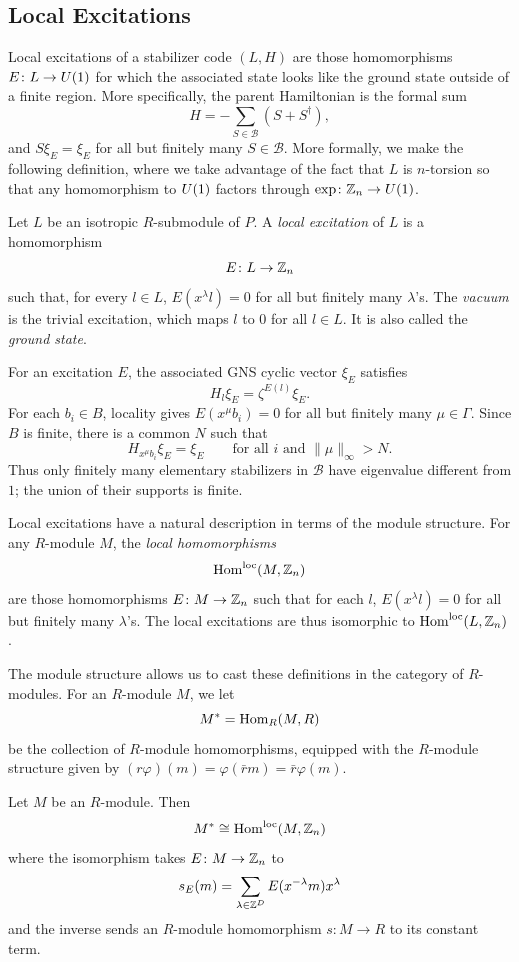 \documentclass[11pt]{amsart}
\begin{document}
\subsection{Local Excitations}
Local excitations of a stabilizer code $(L,H)$ are those homomorphisms $E \colon L \to U(1)$ for which the associated state looks like the ground state outside of a finite region.
More specifically, the parent Hamiltonian is the formal sum
\[H=-\sum_{S\in\mathcal B}(S+S^\dagger),\]
and $S\xi_E=\xi_E$ for all but finitely many $S\in\mathcal B$.
More formally, we make the following definition, where we take advantage of the fact that $L$ is $n$-torsion so that any homomorphism to $U(1)$ factors through $\exp \colon \mathbb{Z}_n \to U(1)$.
\begin{defn}\label{defn:local_excitation}
Let $L$ be an isotropic $R$-submodule of $P$.
A \emph{local excitation} of $L$ is a homomorphism
\[ E \colon L \to \mathbb{Z}_n \]
such that, for every $l\in L$, $E(x^\lambda l)=0$ for all but finitely many $\lambda$'s. The \emph{vacuum} is the trivial excitation, which maps $l$ to $0$ for all $l \in L$. It is also called the \emph{ground state}.
\end{defn}

For an excitation $E$, the associated GNS cyclic vector $\xi_E$ satisfies
\[H_l\xi_E=\zeta^{E(l)}\xi_E.\]
For each $b_i\in B$, locality gives $E(x^\mu b_i)=0$ for all but finitely many $\mu\in\Gamma$. Since $B$ is finite, there is a common $N$ such that
\[
H_{x^\mu b_i}\xi_E=\xi_E
\qquad\text{for all }i\text{ and }\|\mu\|_\infty>N.
\]
Thus only finitely many elementary stabilizers in $\mathcal B$ have eigenvalue different from $1$; the union of their supports is finite.

















Local excitations have a natural description in terms of the module structure.
For any $R$-module $M$, the \emph{local homomorphisms}
\[\mathrm{Hom}^\mathrm{loc}(M,\mathbb{Z}_n)\]
are those homomorphisms $E \colon M \to \mathbb{Z}_n$ such that for each $l$, $E(x^\lambda l)=0$ for all but finitely many $\lambda$'s.
The local excitations are thus isomorphic to
$ \mathrm{Hom}^\mathrm{loc}(L,\mathbb{Z}_n)$.



The module structure allows us to cast these definitions in the category of $R$-modules.
For an $R$-module $M$, we let
\[M^*=\operatorname{Hom}_R(M,R)\]
be the collection of $R$-module homomorphisms, equipped with the $R$-module structure given by $(r\varphi)(m) = \varphi(\bar{r}m) = \bar{r}\varphi(m)$.
 \begin{prop}\label{prop:lochom}
Let $M$ be an $R$-module. Then
\[ M^* \cong \operatorname{Hom}^{\mathrm{loc}}(M,\mathbb{Z}_n)\]
where the isomorphism takes $E \colon M \to \mathbb{Z}_n$ to
  \[ s_E(m) = \sum_{\lambda \in \mathbb{Z}^D} E(x^{-\lambda} m) x^\lambda\]
  and the inverse sends an $R$-module homomorphism $s \colon M \to R$ to its constant term.
  \end{prop}
\end{document}
